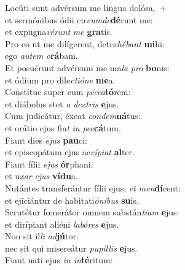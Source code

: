 \evenverse Locúti sunt advérsum me lingua dolósa,~+\\\evenverse  et sermónibus ódii cir\textit{cum}\textit{de}\textbf{dé}runt me:~\*\\
\evenverse et expugna\textit{vé}\textit{runt} \textit{me} \textbf{gra}tis.\\
\oddverse Pro eo ut me dilígerent, detra\textit{hé}\textit{bant} \textbf{mi}hi:~\*\\
\oddverse ego \textit{au}\textit{tem} \textit{o}\textbf{rá}bam.\\
\evenverse Et posuérunt advérsum me ma\textit{la} \textit{pro} \textbf{bo}nis:~\*\\
\evenverse et ódium pro dile\textit{cti}\textit{ó}\textit{ne} \textbf{me}a.\\
\oddverse Constítue super eum \textit{pec}\textit{ca}\textbf{tó}rem:~\*\\
\oddverse et diábolus stet \textit{a} \textit{dex}\textit{tris} \textbf{e}jus.\\
\evenverse Cum judicátur, éxeat \textit{con}\textit{dem}\textbf{ná}tus:~\*\\
\evenverse et orátio ejus fi\textit{at} \textit{in} \textit{pec}\textbf{cá}tum.\\
\oddverse Fiant dies \textit{e}\textit{jus} \textbf{pau}ci:~\*\\
\oddverse et episcopátum ejus ac\textit{cí}\textit{pi}\textit{at} \textbf{al}ter.\\
\evenverse Fiant fílii \textit{e}\textit{jus} \textbf{ór}phani:~\*\\
\evenverse et u\textit{xor} \textit{e}\textit{jus} \textbf{ví}\textbf{du}a.\\
\oddverse Nutántes transferántur fílii ejus, \textit{et} \textit{men}\textbf{dí}cent:~\*\\
\oddverse et ejiciántur de habitati\textit{ó}\textit{ni}\textit{bus} \textbf{su}is.\\
\evenverse Scrutétur fœnerátor omnem substán\textit{ti}\textit{am} \textbf{e}jus:~\*\\
\evenverse et dirípiant aliéni \textit{la}\textit{bó}\textit{res} \textbf{e}jus.\\
\oddverse Non sit il\textit{li} \textit{ad}\textbf{jú}tor:~\*\\
\oddverse nec sit qui misereátur \textit{pu}\textit{píl}\textit{lis} \textbf{e}jus.\\
\evenverse Fiant nati ejus \textit{in} \textit{in}\textbf{té}ritum:~\*\\
